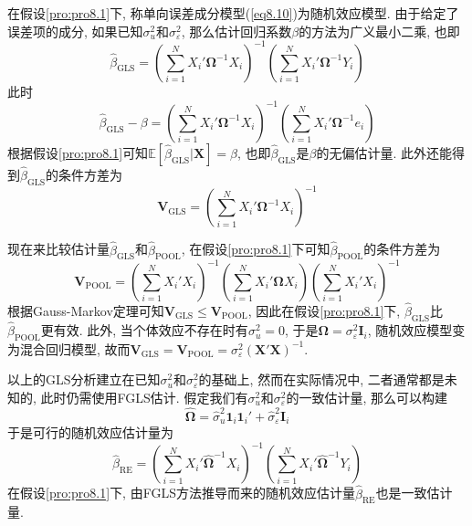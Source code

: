 \documentclass[cn, 12pt, math=mtpro2, bibstyle=apa, blue, twocol]{elegantbook}
\newcommand{\E}{\mathbb{E}}
\newcommand{\X}{\mathbold{X}}
\newcommand{\hb}{\hat{\beta}}
\newcommand{\V}{\mathbold{V}}
\newcommand{\BO}{\mathbold{\Omega}}
\begin{document}
在假设\ref{pro:pro8.1}下, 称单向误差成分模型(\ref{eq8.10})为随机效应模型. 由于给定了误差项的成分, 如果已知$\sigma_u^2$和$\sigma_\varepsilon^2$, 那么估计回归系数$\beta$的方法为广义最小二乘, 也即
$$\hb_{\text{GLS}}=\left(\sum_{i=1}^{N}X_i'\BO^{-1}X_i\right)^{-1}\left(\sum_{i=1}^{N}X_i'\BO^{-1}Y_i\right)$$
此时
$$\hb_{\text{GLS}}-\beta=\left(\sum_{i=1}^{N}X_i'\BO^{-1}X_i\right)^{-1}\left(\sum_{i=1}^{N}X_i'\BO^{-1}e_i\right)$$
根据假设\ref{pro:pro8.1}可知$\E[\hb_{\text{GLS}}|\X]=\beta$, 也即$\hb_{\text{GLS}}$是$\beta$的无偏估计量. 此外还能得到$\hb_{\text{GLS}}$的条件方差为
\begin{equation}\label{eq8.13}
  \V_{\text{GLS}}=\left(\sum_{i=1}^{N}X_i'\BO^{-1}X_i\right)^{-1}
\end{equation}

现在来比较估计量$\hb_{\text{GLS}}$和$\hb_{\text{POOL}}$, 在假设\ref{pro:pro8.1}下可知$\hb_{\text{POOL}}$的条件方差为
$$\V_{\text{POOL}}=\left(\sum_{i=1}^{N}X_i'X_i\right)^{-1}\left(\sum_{i=1}^{N}X_i'\BO X_i\right)\left(\sum_{i=1}^{N}X_i'X_i\right)^{-1}$$
根据Gauss-Markov定理可知$\V_{\text{GLS}}\leq\V_{\text{POOL}}$, 因此在假设\ref{pro:pro8.1}下, $\hb_{\text{GLS}}$比$\hb_{\text{POOL}}$更有效. 此外, 当个体效应不存在时有$\sigma_u^2=0$, 于是$\BO=\sigma_\varepsilon^2\mathbold{I}_i$, 随机效应模型变为混合回归模型, 故而$\V_{\text{GLS}}=\V_{\text{POOL}}=\sigma_\varepsilon^2(\X'\X)^{-1}$.

以上的GLS分析建立在已知$\sigma_u^2$和$\sigma_\varepsilon^2$的基础上, 然而在实际情况中, 二者通常都是未知的, 此时仍需使用FGLS估计. 假定我们有$\sigma_u^2$和$\sigma_\varepsilon^2$的一致估计量, 那么可以构建
$$\hat{\BO}=\hat{\sigma}_u^2\mathbf{1}_i\mathbf{1}_i'+\hat{\sigma}_\varepsilon^2\mathbold{I}_i$$
于是可行的随机效应估计量为
$$\hb_{\text{RE}}=\left(\sum_{i=1}^{N}X_i'\hat{\BO}^{-1}X_i\right)^{-1}\left(\sum_{i=1}^{N}X_i'\hat{\BO}^{-1}Y_i\right)$$
在假设\ref{pro:pro8.1}下, 由FGLS方法推导而来的随机效应估计量$\hb_{\text{RE}}$也是一致估计量.
\end{document}
